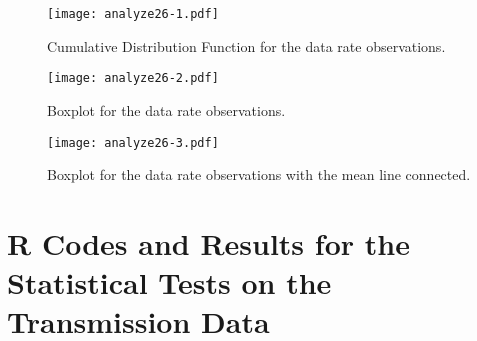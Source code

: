 \newpage



% 
% 
% 



\begin{figure}[!htbp]
 \begin{center}
  \texttt{[image: analyze26-1.pdf]}
 \end{center}
 \caption{Cumulative Distribution Function for the data rate observations.}
  \label{fig:cf261}
\end{figure}

\begin{figure}[!htbp]
 \begin{center}
  \texttt{[image: analyze26-2.pdf]}
 \end{center}
 \caption{Boxplot for the data rate observations.}
  \label{fig:cf262}
\end{figure}

\begin{figure}[!htbp]
 \begin{center}
  \texttt{[image: analyze26-3.pdf]}
 \end{center}
 \caption{Boxplot for the data rate observations with the mean line connected.}
  \label{fig:cf263}
\end{figure}

\newpage



\section{R Codes and Results for the Statistical Tests on the Transmission Data}\label{rtrans}

\begin{Shaded}
\begin{Highlighting}[]
 \NormalTok{)}
\end{Highlighting}
\end{Shaded}


